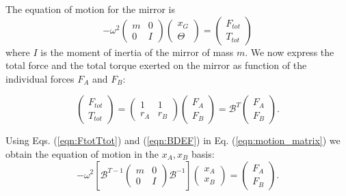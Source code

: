 The equation of motion for the mirror is
\begin{equation}
\label{eqn:motion_matrix}
-\omega^2
\begin{pmatrix}
m & 0 \\ 0 & I
\end{pmatrix}
 \begin{pmatrix}
x_G\\ \Theta
\end{pmatrix}
= 
\begin{pmatrix}
F_{tot}\\ T_{tot}
\end{pmatrix}
\end{equation}
where $I$ is the moment of inertia of the mirror of mass $m$. We now express the total force and the total torque exerted on the mirror
as function of the individual forces $F_A$ and $F_B$:

\begin{equation}
\label{eqn:FtotTtot}
\begin{pmatrix}
F_{tot} \\ T_{tot}
\end{pmatrix}
=
 \begin{pmatrix}
1& 1\\r_A& r_B
\end{pmatrix} 
\begin{pmatrix}
F_A\\ F_B
\end{pmatrix}
=
\mathcal{B}^{T}
\begin{pmatrix}
F_A\\ F_B
\end{pmatrix}.
\end{equation}

Using Eqs. (\ref{eqn:FtotTtot}) and (\ref{eqn:BDEF}) in Eq. (\ref{eqn:motion_matrix}) we obtain the equation of motion in the ${x_A,x_B}$ basis:
\begin{equation}
\label{eqn:M}
-\omega^2
\left[
\mathcal{B}^{T-1}
\begin{pmatrix}
m & 0 \\ 0 & I
\end{pmatrix}
\mathcal{B}^{-1}
\right ]
 \begin{pmatrix}
x_A\\ x_B
\end{pmatrix} 
=
\begin{pmatrix}
F_{A}\\ F_{B}
\end{pmatrix}.
\end{equation}

